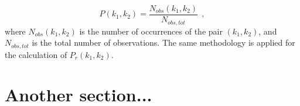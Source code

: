 \begin{equation}
	P(k_1, k_2) = \frac{N_{obs}(k_1, k_2)}{N_{obs, tot}} \ \ ,
	\label{eq:P_joint_task_6_SM}
\end{equation}
where $N_{obs}(k_1, k_2)$ is the number of occurrences of the pair $(k_1, k_2)$, and $N_{obs, tot}$ is the total number of observations. The same methodology is applied for the calculation of $P_r(k_1, k_2)$. 


\section{Another section...}



\newpage